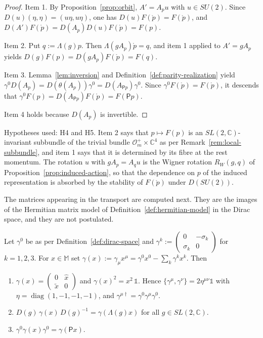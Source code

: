 \begin{proof}
	Item 1. By Proposition~\ref{prop:orbit}, $A'=A_pu$ with $u\in SU(2)$. Since $D(u)(\eta,\eta)=(u\eta,u\eta)$, one has $D(u)F(\mathring{p})=F(\mathring{p})$, and $D(A')F(\mathring{p})=D(A_p)D(u)F(\mathring{p})=F(p)$.
	
	Item 2. Put $q:=\Lambda(g)p$. Then $\Lambda(gA_p)\mathring{p}=q$, and item 1 applied to $A'=gA_p$ yields $D(g)F(p)=D(gA_p)F(\mathring{p})=F(q)$.
	
	Item 3. Lemma~\ref{lem:inversion} and Definition~\ref{def:parity-realization} yield $\gamma^0D(A_p)=D(\theta(A_p))\gamma^0=D(A_{\mathsf{P}p})\gamma^0$. Since $\gamma^0F(\mathring{p})=F(\mathring{p})$, it descends that $\gamma^0F(p)=D(A_{\mathsf{P}p})F(\mathring{p})=F(\mathsf{P}p)$.
	
	Item 4 holds because $D(A_p)$ is invertible.
\end{proof}

\noindent Hypotheses used: H4 and H5. Item 2 says that $p\mapsto F(p)$ is an $SL(2,\mathbb{C})$-invariant subbundle of the trivial bundle $\mathcal{O}_m^+\times\mathbb{C}^4$ as per Remark~\ref{rem:local-subbundle}, and item 1 says that it is determined by its fibre at the rest momentum. The rotation $u$ with $gA_p=A_qu$ is the Wigner rotation $R_W(g,q)$ of Proposition~\ref{prop:induced-action}, so that the dependence on $p$ of the induced representation is absorbed by the stability of $F(\mathring{p})$ under $D(SU(2))$.

The matrices appearing in the transport are computed next. They are the images of the Hermitian matrix model of Definition~\ref{def:hermitian-model} in the Dirac space, and they are not postulated.

\begin{lemma}\label{lem:gamma}
	Let $\gamma^0$ be as per Definition~\ref{def:dirac-space} and $\gamma^k:=\begin{pmatrix}0&-\sigma_k\\\sigma_k&0\end{pmatrix}$ for $k=1,2,3$. For $x\in\mathbb{M}$ set $\gamma(x):=\gamma_\mu x^\mu=\gamma^0x^0-\sum_k\gamma^kx^k$. Then
	\begin{enumerate}
		\item $\gamma(x)=\begin{pmatrix}0&\hat{x}\\\tilde{x}&0\end{pmatrix}$ and $\gamma(x)^2=x^2\,\mathbb{1}$. Hence $\{\gamma^\mu,\gamma^\nu\}=2\eta^{\mu\nu}\mathbb{1}$ with $\eta=\operatorname{diag}(1,-1,-1,-1)$, and $\gamma^{\mu\dagger}=\gamma^0\gamma^\mu\gamma^0$.
		\item $D(g)\,\gamma(x)\,D(g)^{-1}=\gamma(\Lambda(g)x)$ for all $g\in SL(2,\mathbb{C})$.
		\item $\gamma^0\gamma(x)\gamma^0=\gamma(\mathsf{P}x)$.
	\end{enumerate}
\end{lemma}


